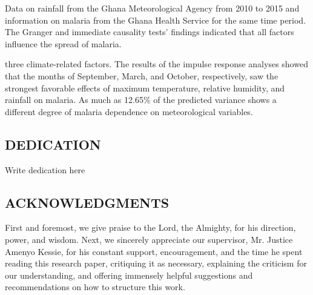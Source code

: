 \documentclass[12pt,a4paper]{book}
\begin{document}
	Data on rainfall from the Ghana Meteorological Agency from 2010 to 2015 and information on malaria from the Ghana Health Service for the same time period. The Granger and immediate causality tests' findings indicated that all factors influence the spread of malaria.
	
	three climate-related factors. The results of the impulse response analyses showed that the months of September, March, and October, respectively, saw the strongest favorable effects of maximum temperature, relative humidity, and rainfall on malaria. As much as 12.65\% of the predicted variance shows a different degree of malaria dependence on meteorological variables.
	
	\newpage	
	\begin{center}\section*{DEDICATION}\end{center}
	
	Write dedication here   
	\newpage	
	\begin{center}\section*{ACKNOWLEDGMENTS}\end{center}
	
	First and foremost, we give praise to the Lord, the Almighty, for his direction, power, and wisdom. Next, we sincerely appreciate our supervisor, Mr. Justice Amenyo Kessie, for his constant support, encouragement, and the time he spent reading this research paper, critiquing it as necessary, explaining the criticism for our understanding, and offering immensely helpful suggestions and recommendations on how to structure this work.
	
	\newpage
	\tableofcontents
	\newpage
	\listoftables
	\newpage
	\listoffigures
	\newpage
\end{document}
